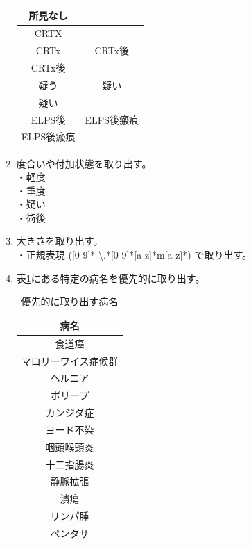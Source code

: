 \begin{enumerate}
\begin{table}[htbp]
\begin{tabular}{c|c}
                所見なし & \\ \hline
                CRTX & \\
                CRTx & CRTx後 \\
                CRTx後 & \\ \hline
                疑う & 疑い \\
                疑い & \\ \hline
                ELPS後 & ELPS後瘢痕 \\
                ELPS後瘢痕 & \\ \hline
            \end{tabular}
        \end{table}
    \item 度合いや付加状態を取り出す。 \\
        ・軽度 \\
        ・重度 \\
        ・疑い \\
        ・術後
    \item 大きさを取り出す。 \\
        ・正規表現 ([0-9]* \textbackslash .*[0-9]*[a-z]*m[a-z]*) で取り出す。
    \item 表\ref{tb:nl3}にある特定の病名を優先的に取り出す。
        \begin{table}[htbp]
            \caption[]{優先的に取り出す病名}
            \label{tb:nl3}
            \centering
            \normalsize
            \begin{tabular}{|c|} \hline
                病名 \\ \hline \hline
                食道癌 \\ \hline
                マロリーワイス症候群 \\ \hline
                ヘルニア \\ \hline
                ポリープ \\ \hline
                カンジダ症 \\ \hline
                ヨード不染 \\ \hline
                咽頭喉頭炎 \\ \hline
                十二指腸炎 \\ \hline
                静脈拡張 \\ \hline
                潰瘍 \\ \hline
                リンパ腫 \\ \hline
                ペンタサ \\ \hline
            \end{tabular}

\end{table}
\end{enumerate}
